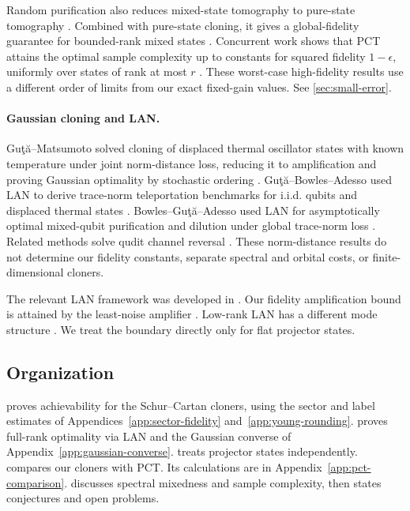 \documentclass[11pt]{article}
\theoremstyle{remark}
\theoremstyle{plain}
\begin{document}
Random purification \cite{TangWrightZhandry2025,
GirardiMeleLami2025} also reduces mixed-state tomography to pure-state
tomography \cite{PelecanosSpileckiTangWright2025}.  Combined with pure-state
cloning, it gives a global-fidelity guarantee for bounded-rank mixed states
\cite{LiTheilHarrowChuang2026}.  Concurrent work shows
that PCT attains the optimal sample complexity up to constants for squared
fidelity \(1-\epsilon\), uniformly over states of rank at most \(r\)
\cite{FanizzaGrinkoScharnhorstSpilecki2026,JeonSohnOh2026}.
These worst-case high-fidelity results use a different order of limits
from our exact fixed-gain values. See \cref{sec:small-error}.

\paragraph{Gaussian cloning and LAN.}
Gu{\c t}{\u a}--Matsumoto solved cloning of displaced thermal oscillator
states with known temperature under joint norm-distance loss, reducing it
to amplification and proving Gaussian optimality by stochastic ordering
\cite{GutaMatsumoto2006MixedGaussianCloning}.
Gu{\c t}{\u a}--Bowles--Adesso used LAN to derive trace-norm
teleportation benchmarks for i.i.d. qubits and displaced thermal states
\cite{GutaBowlesAdesso2010Teleportation}.
Bowles--Gu{\c t}{\u a}--Adesso used LAN for asymptotically optimal
mixed-qubit purification and dilution under global trace-norm loss
\cite{BowlesGutaAdesso2011Purification}. Related methods solve qudit channel
reversal \cite{BowlesGutaAdesso2012Reversal}.  These norm-distance results
do not determine our fidelity constants, separate spectral and orbital
costs, or finite-dimensional cloners.

The relevant LAN framework was developed in
\cite{GutaJencova2007LAN,GutaKahn2006LANQubits,
KahnGuta2009LANFiniteDimensional}.
Our fidelity amplification bound is attained by the least-noise amplifier
\cite{Caves1982LinearAmplifiers,GutaMatsumoto2006MixedGaussianCloning}.
Low-rank LAN has a different mode structure \cite{LahiryNussbaum2024}. We
treat the boundary directly only for flat projector states.

\subsection{Organization}

 proves achievability for the Schur--Cartan cloners,
using the sector and label estimates of
Appendices~\ref{app:sector-fidelity} and~\ref{app:young-rounding}.
 proves full-rank optimality via LAN and the Gaussian
converse of Appendix~\ref{app:gaussian-converse}.
 treats projector states independently.
 compares our cloners with PCT. Its calculations
are in Appendix~\ref{app:pct-comparison}.
 discusses spectral mixedness and sample complexity,
then states conjectures and open problems.
\end{document}
